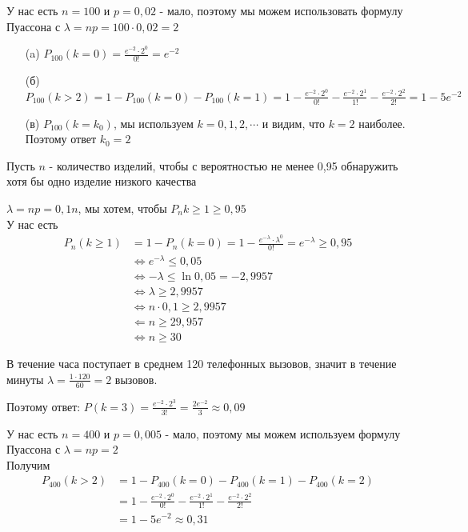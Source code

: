 \begin{exercise}[5]
	У нас есть $n = 100$ и $p=0,02$ - мало, поэтому мы можем использовать формулу Пуассона с $\lambda = np = 100 \cdot 0,02 = 2$
	\begin{enumerate}
		\item [(a)] $P_{100} (k=0) = \frac{e^{-2} \cdot 2^0}{0!} = e^{-2}$
		\item [(б)] $P_{100} (k>2) = 1-P_{100} (k = 0) - P_{100} (k = 1) = 1 - \frac{e^{-2} \cdot 2^0}{0!} - \frac{e^{-2} \cdot 2^1}{1!} - \frac{e^{-2} \cdot 2^2}{2!} = 1 - 5e^{-2}$
		\item [(в)] $P_{100} (k = k_0)$, мы используем $k=0, 1, 2, \cdots$ и видим, что $k=2$ наиболее. Поэтому ответ $k_0 = 2$
	\end{enumerate}
\end{exercise}

\begin{exercise}[6]
	Пусть $n$ - количество изделий, чтобы с вероятностью не менее 0,95 обнаружить хотя бы одно изделие низкого качества
	
	$\lambda = np = 0,1 n$, мы хотем, чтобы $P_n{k \geq 1} \geq 0,95$ \\ У нас есть
	\begin{align*}
		P_n(k \geq 1) & = 1 - P_n(k = 0) = 1 - \frac{e^{-\lambda} \cdot \lambda^0}{0!} = e^{-\lambda} \geq 0,95 \\ & \Leftrightarrow e^{-\lambda} \leq 0,05 \\ & \Leftrightarrow -\lambda \leq \ln{0,05} = -2,9957 \\ & \Leftrightarrow \lambda \geq 2,9957 \\ & \Leftrightarrow n \cdot 0,1 \geq 2,9957 \\ & \Leftarrow n \geq 29,957 \\ & \Leftrightarrow n \geq 30
	\end{align*}
\end{exercise}

\begin{exercise}[7]
	В течение часа поступает в среднем 120 телефонных вызовов, значит в течение минуты $\lambda = \frac{1 \cdot 120}{60} = 2$ вызовов.
	
	Поэтому ответ: $P(k=3) = \frac{e^{-2} \cdot 2^3}{3!} = \frac{2e^{-2}}{3} \approx 0,09$
\end{exercise}

\begin{exercise}[8]
	У нас есть $n=400$ и $p=0,005$ - мало, поэтому мы можем используем формулу Пуассона с $\lambda = np = 2$ \\ Получим
	\begin{align*}
		P_{400} (k > 2) & = 1 - P_{400}(k=0) - P_{400}(k=1) - P_{400}(k=2) \\ & = 1 - \frac{e^{-2} \cdot 2^0}{0!} - \frac{e^{-2} \cdot 2^1}{1!} - \frac{e^{-2} \cdot 2^2}{2!} \\ & = 1 - 5e^{-2} \approx 0,31
	\end{align*}
\end{exercise}

